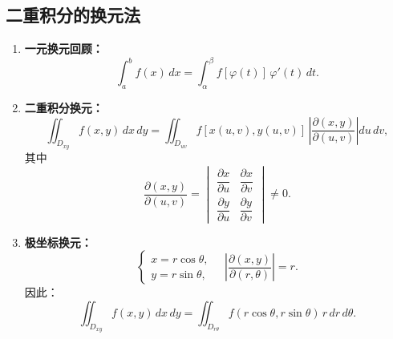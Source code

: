 \subsection{二重积分的换元法}

\begin{enumerate}
    \item \textbf{一元换元回顾：}
          \[
              \int_a^b f(x)\,dx = \int_{\alpha}^{\beta} f[\varphi(t)]\,\varphi'(t)\,dt.
          \]
    \item \textbf{二重积分换元：}
          \[
              \iint_{D_{xy}} f(x,y)\,dx\,dy
              = \iint_{D_{uv}} f[x(u,v),y(u,v)]\,
              \left|\frac{\partial(x,y)}{\partial(u,v)}\right| du\,dv,
          \]
          其中
          \[
              \frac{\partial(x,y)}{\partial(u,v)} =
              \begin{vmatrix}
                  \dfrac{\partial x}{\partial u} & \dfrac{\partial x}{\partial v} \\[4pt]
                  \dfrac{\partial y}{\partial u} & \dfrac{\partial y}{\partial v}
              \end{vmatrix} \ne 0.
          \]

    \item \textbf{极坐标换元：}
          \[
              \begin{cases}
                  x = r\cos\theta, \\
                  y = r\sin\theta,
              \end{cases}
              \quad
              \left|\dfrac{\partial(x,y)}{\partial(r,\theta)}\right|
              = r.
          \]
          因此：
          \[
              \iint_{D_{xy}} f(x,y)\,dx\,dy
              = \iint_{D_{r\theta}} f(r\cos\theta, r\sin\theta)\,r\,dr\,d\theta.
          \]
\end{enumerate}